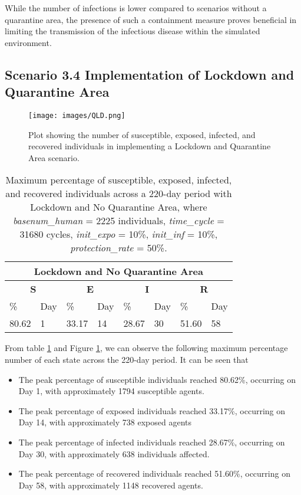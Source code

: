 While the number of infections is lower compared to scenarios without a quarantine area, the presence of such a containment measure proves beneficial in limiting the transmission of the infectious disease within the simulated environment.

\subsection{ Scenario 3.4 Implementation of Lockdown and Quarantine Area}
\label{3.4}
\begin{figure}[H]
\centering
\texttt{[image: images/QLD.png]}
\caption{Plot showing the number of susceptible, exposed, infected, and recovered individuals in implementing a Lockdown and Quarantine Area scenario. }
\label{LD4} 
\end{figure}
\begin{table} [H]
\centering
\begin{tabular}{|l|l|l|l|l|l|l|l|}
	\hline
	\multicolumn{8}{|c|}{\textbf{Lockdown and No Quarantine Area}}\\
	\hline
	\multicolumn{2}{|c|}{\textbf{S}} &  \multicolumn{2}{|c|}{\textbf{E}}&  \multicolumn{2}{|c|}{\textbf{I}}&  \multicolumn{2}{|c|}{\textbf{R}}\\
	\hline
	\%& Day & \% & Day & \%  & Day & \% & Day \\
	\hline
	80.62& 1 &33.17& 14&  28.67& 30& 51.60&58\\
	\hline
\end{tabular}
\caption{Maximum percentage of susceptible, exposed, infected, and recovered individuals across a 220-day period with Lockdown and No Quarantine Area, where \textit{basenum\_human} = 2225 individuals, \textit{time\_cycle} = 31680 cycles, \textit{init\_expo} = 10\%, \textit{init\_inf} = 10\%,  \textit{protection\_rate} = 50\%.}
\label{LD4_Max}
\end{table}
From table \ref{LD4_Max} and Figure \ref{LD4}, we can observe the following maximum percentage number of each state across the 220-day period. It can be seen that 

\begin{itemize}

\item The peak percentage of susceptible individuals reached 80.62\%, occurring on Day 1, with approximately 1794 susceptible agents.
\item The peak percentage of exposed individuals reached 33.17\%, occurring on Day 14, with approximately 738 exposed agents
\item The peak percentage of infected individuals reached 28.67\%, occurring on Day 30, with approximately 638 individuals affected.
\item The peak percentage of recovered individuals reached 51.60\%, occurring on Day 58, with approximately 1148 recovered agents. 
\end{itemize}

